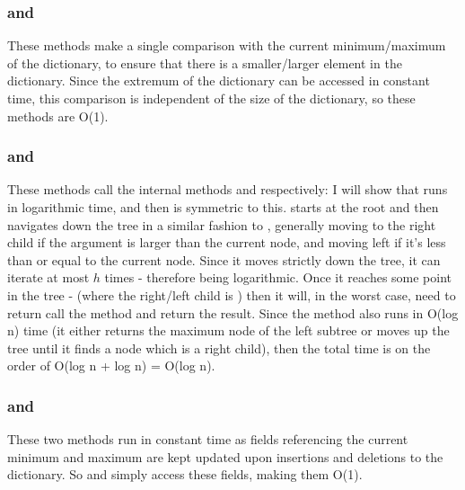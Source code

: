 \subsubsection{ and }
These methods make a single comparison with the current minimum/maximum of the dictionary, to ensure that there is a smaller/larger element in the dictionary. Since the extremum of the dictionary can be accessed in constant time, this comparison is independent of the size of the dictionary, so these methods are O(1).

\subsubsection{ and }
These methods call the internal methods  and  respectively: I will show that  runs in logarithmic time, and then  is symmetric to this.  starts at the root and then navigates down the tree in a similar fashion to , generally moving to the right child if the argument is larger than the current node, and moving left if it's less than or equal to the current node. Since it moves strictly down the tree, it can iterate at most $h$ times - therefore being logarithmic.
Once it reaches some point in the tree - (where the right/left child is ) then it will, in the worst case, need to return call the  method and return the result. Since the  method also runs in O(log n) time (it either returns the maximum node of the left subtree or moves up the tree until it finds a node which is a right child), then the total time is on the order of O(log n + log n) = O(log n).

\subsubsection{ and }
These two methods run in constant time as fields referencing the current minimum and maximum are kept updated upon insertions and deletions to the dictionary. So  and  simply access these fields, making them O(1).

